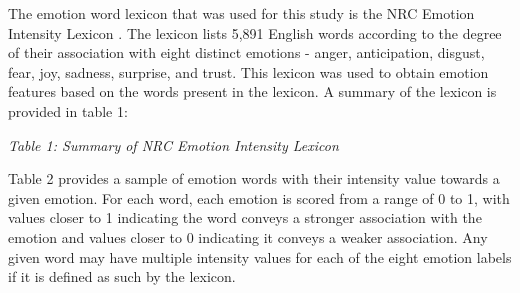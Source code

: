 \documentclass{icsthesis}
\begin{document}
\begin{mainmatter}
                The emotion word lexicon that was used for this study is the NRC Emotion Intensity Lexicon \citep{Mohammad2}. The lexicon lists 5,891 English words according to the degree of their association with eight distinct emotions - anger, anticipation, disgust, fear, joy, sadness, surprise, and trust.  This lexicon was used to obtain emotion features based on the words present in the lexicon. A summary of the lexicon is provided in table 1:
                
                \begin{table}[h!]
                    \centering
                    \emph{Table 1: Summary of NRC Emotion Intensity Lexicon}
                \end{table}
                
                Table 2 provides a sample of emotion words with their intensity value towards a given emotion. For each word, each emotion is scored from a range of 0 to 1, with values closer to 1 indicating the word conveys a stronger association with the emotion and values closer to 0 indicating it conveys a weaker association. Any given word may have multiple intensity values for each of the eight emotion labels if it is defined as such by the lexicon.
                

\end{mainmatter}
\end{document}
